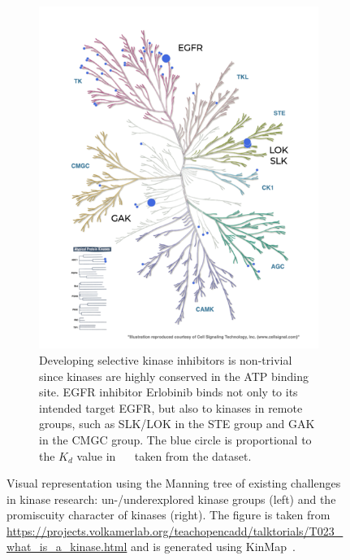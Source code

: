 \documentclass[9pt,training]{livecoms}
\begin{document}
\begin{figure}
\begin{subfigure}[b]{0.45\textwidth}
         \includegraphics[width=\textwidth]{kinmap_erlotinib_karaman.png}
         \caption{Developing selective kinase inhibitors is non-trivial since kinases are highly conserved in the ATP binding site. EGFR inhibitor Erlobinib binds not only to its intended target EGFR, but also to kinases in remote groups, such as SLK/LOK in the STE group and GAK in the CMGC group. The blue circle is proportional to the $K_d$ value in \SI{}{\nano\Molar} taken from the \citet{Karaman_2008_NatBiotechnol} dataset.}
         \label{fig:off_target}
     \end{subfigure}
        \caption{Visual representation using the Manning tree of existing challenges in kinase research: un-/underexplored kinase groups (left) and the promiscuity character of kinases (right). The figure is taken from \href{https://projects.volkamerlab.org/teachopencadd/talktorials/T023\_what\_is\_a\_kinase.html}{https://projects.volkamerlab.org/teachopencadd/talktorials/T023\_what\_is\_a\_kinase.html} and is generated using KinMap~\cite{Eid_2017_BMCBioinformatics}.}
        \label{fig:kinmap}
\end{figure}
\end{document}
